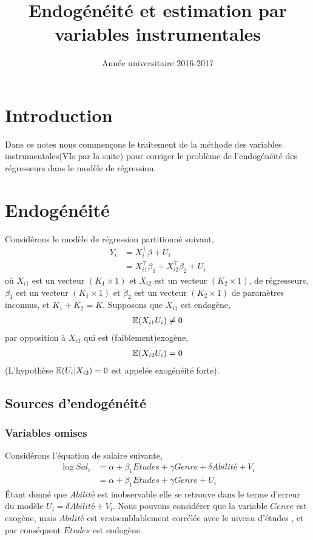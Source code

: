 \documentclass[12pt, reqno]{amsart}
\title{Endogénéité  et estimation par variables instrumentales}
\date{Année universitaire 2016-2017}
\begin{document}
\maketitle
\section{Introduction}
Dans ce notes nous commençons le traitement de la méthode des variables instrumentales(VIs par la suite)  pour corriger le problème de l'endogénéité des régresseurs dans le modèle de régression. 
\section{Endogénéité}
Considérons le modèle de régression partitionné suivant,
\begin{align}
Y_i &= X_i^\top\beta + U_i \nonumber\\
&= X_{i1}^\top\beta_1 + X_{i2}^\top\beta_2 + U_i 
\label{eq1}
\end{align}
où $X_{i1}$ est un vecteur $(K_1\times 1)$ et  $X_{i2}$ est un vecteur $(K_2\times 1)$, de régresseurs, $\beta_1$ est un vecteur $(K_1\times 1)$ et $\beta_2$ est un vecteur $(K_2\times 1)$ de paramètres inconnus, et $K_1 + K_2 = K$. Supposons que $X_{i1}$ est endogène,
\begin{align*}
\mathbb{E}(X_{i1}U_i) \neq 0
\end{align*}
par opposition à $X_{i2}$ qui est (faiblement)exogène,
\begin{align*}
\mathbb{E}(X_{i2}U_i) = 0
\end{align*}
(L'hypothèse $\mathbb{E}(U_i| X_{i2}) = 0$ est appelée exogénéité forte). 
\subsection{Sources d'endogénéité}
\subsubsection*{Variables omises}
Considérons l'équation de salaire suivante,
\begin{align*}
\log Sal_i &= \alpha + \beta_1Etudes + \gamma Genre + \delta Abilité + V_i\\
&=\alpha + \beta_1Etudes + \gamma Genre + U_i
\end{align*}
\'Etant donné que $Abilité$ est inobservable elle se retrouve dans le terme d'erreur du modèle $U_i = \delta Abilité + V_i$. Nous pouvons considérer que la variable $Genre$ est exogène, mais $Abilité$ est vraisemblablement corrélée avec le niveau d'études , et par conséquent $Etudes$ est endogène.
\end{document}
